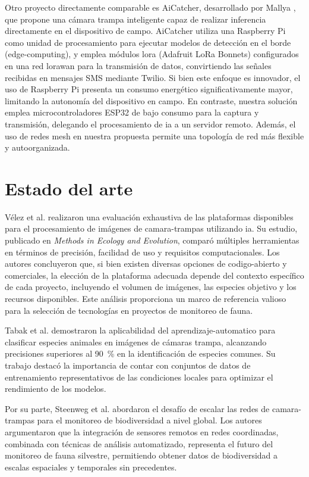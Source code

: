 \documentclass[a4paper, 12pt]{report}
\begin{document}
Otro proyecto directamente comparable es AiCatcher, desarrollado por
Mallya \cite{mallya2019aicatcher}, que propone una cámara trampa inteligente
capaz de realizar \gls{inferencia} directamente en el dispositivo de campo.
AiCatcher utiliza una Raspberry Pi como unidad de procesamiento para ejecutar
modelos de detección en el borde (\gls{edge-computing}), y emplea módulos \gls{lora}
(Adafruit LoRa Bonnets) configurados en una red \gls{lorawan} para la transmisión
de datos, convirtiendo las señales recibidas en mensajes SMS mediante Twilio.
Si bien este enfoque es innovador, el uso de Raspberry Pi presenta un consumo
energético significativamente mayor, limitando la autonomía del dispositivo
en campo. En contraste, nuestra solución emplea microcontroladores \gls{ESP32}
de bajo consumo para la captura y transmisión, delegando el procesamiento
de \gls{ia} a un servidor remoto. Además, el uso de redes \gls{mesh} en
nuestra propuesta permite una topología de red más flexible y autoorganizada.

\section{Estado del arte}

Vélez et al. \cite{velez2022platforms} realizaron una evaluación exhaustiva
de las plataformas disponibles para el procesamiento de imágenes de
\glspl{camara-trampa} utilizando \gls{ia}. Su estudio, publicado en
\textit{Methods in Ecology and Evolution}, comparó múltiples herramientas
en términos de precisión, facilidad de uso y requisitos computacionales.
Los autores concluyeron que, si bien existen diversas opciones de
\gls{codigo-abierto} y comerciales, la elección de la plataforma adecuada
depende del contexto específico de cada proyecto, incluyendo el volumen
de imágenes, las especies objetivo y los recursos disponibles. Este análisis
proporciona un marco de referencia valioso para la selección de tecnologías
en proyectos de monitoreo de fauna.

Tabak et al. \cite{tabak2019machine} demostraron la aplicabilidad del
\gls{aprendizaje-automatico} para clasificar especies animales en imágenes de
cámaras trampa, alcanzando precisiones superiores al \qty{90}{\percent} en la identificación
de especies comunes. Su trabajo destacó la importancia de contar con conjuntos
de datos de entrenamiento representativos de las condiciones locales para
optimizar el rendimiento de los modelos.

Por su parte, Steenweg et al. \cite{steenweg2017scaling} abordaron el desafío
de escalar las redes de \glspl{camara-trampa} para el monitoreo de biodiversidad
a nivel global. Los autores argumentaron que la integración de sensores remotos
en redes coordinadas, combinada con técnicas de análisis automatizado, representa
el futuro del monitoreo de fauna silvestre, permitiendo obtener datos de
biodiversidad a escalas espaciales y temporales sin precedentes.
\end{document}
